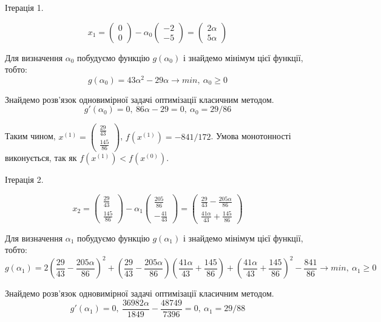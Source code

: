 \documentclass[14pt,a4paper]{extarticle}
\theoremstyle{definition}
\renewcommand{\[}{\begin{dmath*}[compact]}
\renewcommand{\]}{\end{dmath*}}
\newcommand{\sep}{ , \ \allowbreak }
\begin{document}
Ітерація 1.

\[x_{1} = \left(\begin{matrix}0\\0\end{matrix}\right) - \alpha_0 \left(\begin{matrix}-2\\-5\end{matrix}\right) = \left(\begin{matrix}2 \alpha\\5 \alpha\end{matrix}\right)\]

Для визначення $\alpha_0$ побудуємо функцію $g(\alpha_0)$ і знайдемо мінімум цієї функції, тобто:
\[g(\alpha_0)=43 \alpha^{2} - 29 \alpha \to min \sep \alpha_0 \geq 0\]

Знайдемо розв'язок одновимірної задачі оптимізації класичним методом.
\[g'(\alpha_0)=0 \sep 86 \alpha - 29=0 \sep \alpha_0=29/86\]

Таким чином, $x^{(1)} = \left(\begin{matrix}\frac{29}{43}\\\frac{145}{86}\end{matrix}\right)$, $f(x^{(1)})=-841/172$.
Умова монотонності виконується, так як $f(x^{(1)})<f(x^{(0)})$.

Ітерація 2.

\[x_{2} = \left(\begin{matrix}\frac{29}{43}\\\frac{145}{86}\end{matrix}\right) - \alpha_1 \left(\begin{matrix}\frac{205}{86}\\- \frac{41}{43}\end{matrix}\right) = \left(\begin{matrix}\frac{29}{43} - \frac{205 \alpha}{86}\\\frac{41 \alpha}{43} + \frac{145}{86}\end{matrix}\right)\]

Для визначення $\alpha_1$ побудуємо функцію $g(\alpha_1)$ і знайдемо мінімум цієї функції, тобто:
\[g(\alpha_1)=2 \left(\frac{29}{43} - \frac{205 \alpha}{86}\right)^{2} + \left(\frac{29}{43} - \frac{205 \alpha}{86}\right) \left(\frac{41 \alpha}{43} + \frac{145}{86}\right) + \left(\frac{41 \alpha}{43} + \frac{145}{86}\right)^{2} - \frac{841}{86} \to min \sep \alpha_1 \geq 0\]

Знайдемо розв'язок одновимірної задачі оптимізації класичним методом.
\[g'(\alpha_1)=0 \sep \frac{36982 \alpha}{1849} - \frac{48749}{7396}=0 \sep \alpha_1=29/88\]
\end{document}
